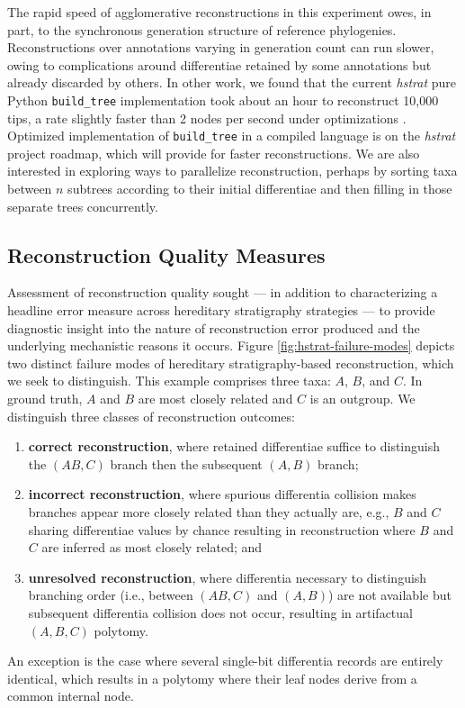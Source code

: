 The rapid speed of agglomerative reconstructions in this experiment owes, in part, to the synchronous generation structure of reference phylogenies.
Reconstructions over annotations varying in generation count can run slower, owing to complications around differentiae retained by some annotations but already discarded by others.
In other work, we found that the current \textit{hstrat} pure Python \texttt{build\_tree} implementation took about an hour to reconstruct 10,000 tips, a rate slightly faster than 2 nodes per second under optimizations \citep{moreno2024trackable}.
Optimized implementation of \texttt{build\_tree} in a compiled language is on the \textit{hstrat} project roadmap, which will provide for faster reconstructions.
We are also interested in exploring ways to parallelize reconstruction, perhaps by sorting taxa between $n$ subtrees according to their initial differentiae and then filling in those separate trees concurrently.

\subsection{Reconstruction Quality Measures}



Assessment of reconstruction quality sought --- in addition to characterizing a headline error measure across hereditary stratigraphy strategies --- to provide diagnostic insight into the nature of reconstruction error produced and the underlying mechanistic reasons it occurs.
Figure \ref{fig:hstrat-failure-modes} depicts two distinct failure modes of hereditary stratigraphy-based reconstruction, which we seek to distinguish.
This example comprises three taxa: $A$, $B$, and $C$.
In ground truth, $A$ and $B$ are most closely related and $C$ is an outgroup.
We distinguish three classes of reconstruction outcomes:
\begin{enumerate}
\item \textbf{correct reconstruction}, where retained differentiae suffice to distinguish the $(AB,C)$ branch then the subsequent $(A,B)$ branch;
\item \textbf{incorrect reconstruction}, where spurious differentia collision makes branches appear more closely related than they actually are, e.g., $B$ and $C$ sharing differentiae values by chance resulting in reconstruction where $B$ and $C$ are inferred as most closely related; and
\item \textbf{unresolved reconstruction}, where differentia necessary to distinguish branching order (i.e., between $(AB,C)$ and $(A,B)$) are not available but subsequent differentia collision does not occur, resulting in artifactual $(A,B,C)$ polytomy.
\end{enumerate}
An exception is the case where several single-bit differentia records are entirely identical, which results in a polytomy where their leaf nodes derive from a common internal node.

